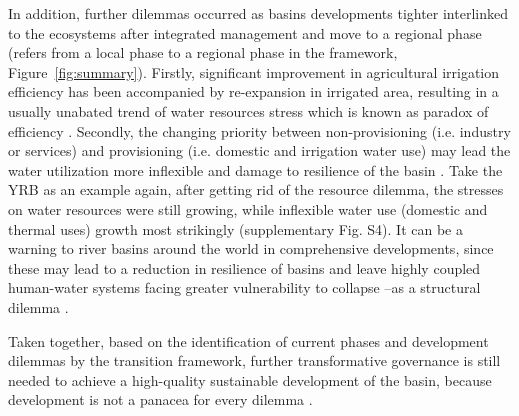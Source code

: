 \documentclass[9pt, twocolumn, twoside, lineno]{pnas-new}
\begin{document}
In addition, further dilemmas occurred as basins developments tighter interlinked to the ecosystems after integrated management and move to a regional phase (refers from a local phase to a regional phase in the framework, Figure~\ref{fig:summary}).
Firstly, significant improvement in agricultural irrigation efficiency has been accompanied by re-expansion in irrigated area, resulting in a usually unabated trend of water resources stress which is known as paradox of efficiency \cite{graftonParadoxIrrigationEfficiency2018}. 
Secondly, the changing priority between non-provisioning (i.e. industry or services) and provisioning (i.e. domestic and irrigation water use) may lead the water utilization more inflexible and damage to resilience of the basin \cite{qinFlexibilityIntensityGlobal2019}.
Take the YRB as an example again, after getting rid of the resource dilemma, the stresses on water resources were still growing, while inflexible water use (domestic and thermal uses) growth most strikingly (supplementary Fig. S4). 
It can be a warning to river basins around the world in comprehensive developments, since these may lead to a reduction in resilience of basins and leave highly coupled human-water systems facing greater vulnerability to collapse --as a structural dilemma \cite{cummingResilienceBigRiver2011}. 

Taken together, based on the identification of current phases and development dilemmas by the transition framework, further transformative governance is still needed to achieve a high-quality sustainable development of the basin, because development is not a panacea for every dilemma \cite{scoonesTransformationsSustainabilityCombining2020a}.
\end{document}
